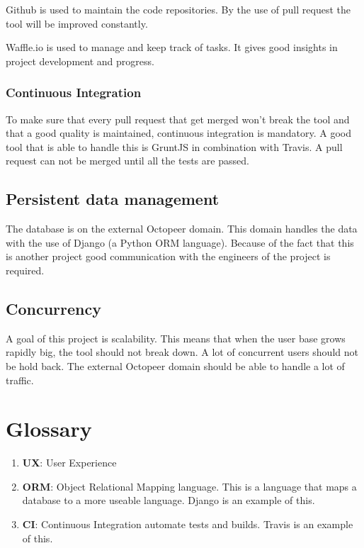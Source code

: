 \documentclass{article}
\begin{document}
Github is used to maintain the code repositories. By the use of pull request the tool will be improved constantly.

Waffle.io is used to manage and keep track of tasks. It gives good insights in project development and progress.

\subsubsection{Continuous Integration}

To make sure that every pull request that get merged won't break the tool and that a good quality is maintained, continuous integration is mandatory. A good tool that is able to handle this is GruntJS in combination with Travis. A pull request can not be merged until all the tests are passed.

\subsection{Persistent data management}

The database is on the external Octopeer domain. This domain handles the data with the use of Django (a Python ORM language). Because of the fact that this is another project good communication with the engineers of the project is required.

\subsection{Concurrency}

A goal of this project is scalability. This means that when the user base grows rapidly big, the tool should not break down. A lot of concurrent users should not be hold back. The external Octopeer domain should be able to handle a lot of traffic.

\section{Glossary}

\begin{enumerate}
    \item \textbf{UX}: User Experience
    \item \textbf{ORM}: Object Relational Mapping language. This is a language that maps a database to a more useable language. Django is an example of this.
    \item \textbf{CI}: Continuous Integration automate tests and builds. Travis is an example of this.
\end{enumerate}
\end{document}
